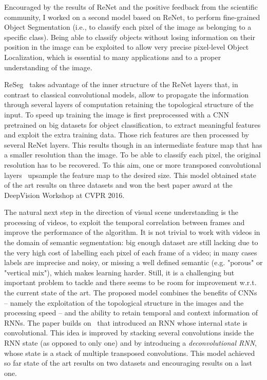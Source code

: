 Encouraged by the results of ReNet and the positive feedback from the
scientific community, I worked on a second model based on ReNet, to perform
fine-grained Object Segmentation (i.e., to classify each pixel of the image as
belonging to a specific class). Being able to classify objects without losing
information on their position in the image can be exploited to allow very
precise pixel-level Object Localization, which is essential to many
applications and to a proper understanding of the image.

ReSeg~\citep{visin15} takes advantage of the inner structure of the ReNet
layers that, in contrast to classical convolutional models, allow to propagate
the information through several layers of computation retaining the topological
structure of the input. To speed up training the image is first preprocessed
with a CNN pretrained on big datasets for object classification, to extract
meaningful features and exploit the extra training data. Those rich features
are then processed by several ReNet layers. This results though in an
intermediate feature map that has a smaller resolution than the image. To be
able to classify each pixel, the original resolution has to be recovered. To
this aim, one or more transposed convolutional layers~\citep{dumoulin2016guide}
upsample the feature map to the desired size. This model obtained state of the
art results on three datasets and won the best paper award at the DeepVision
Workshop at CVPR 2016.

The natural next step in the direction of visual scene understanding is the
processing of videos, to exploit the temporal correlation between frames and
improve the performance of the algorithm. It is not trivial to work with videos
in the domain of semantic segmentation: big enough dataset are still lacking
due to the very high cost of labelling each pixel of each frame of a video; in
many cases labels are imprecise and noisy, or missing a well defined semantic
(e.g. "porous" or "vertical mix"), which makes learning harder. Still, it is
a challenging but important problem to tackle and there seems to be room for
improvement w.r.t. the current state of the art. The proposed model combines
the benefits of CNNs -- namely the exploitation of the topological structure in
the images and the processing speed -- and the ability to retain temporal and
context information of RNNs. The paper builds
on~\cite{xingjian2015convolutional} that introduced an RNN whose internal state
is convolutional. This idea is improved by stacking several convolutions inside
the RNN state (as opposed to only one) and by introducing a
\emph{deconvolutional RNN}, whose state is a stack of multiple transposed
convolutions. This model achieved so far state of the art results on two
datasets and encouraging results on a last one.

